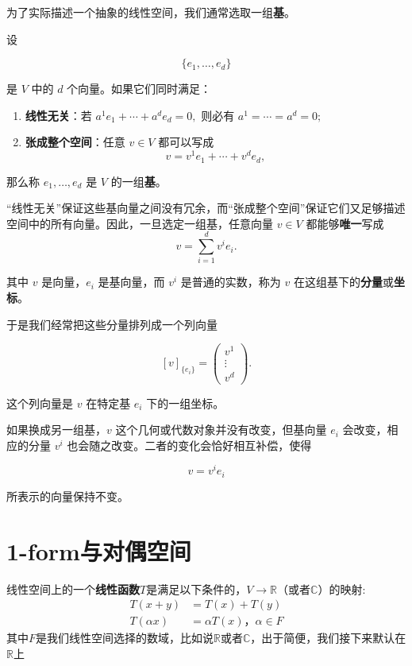 \documentclass[UTF8,11pt,a4paper,fontset=fandol]{ctexart}
\numberwithin{equation}{section}
\begin{document}
为了实际描述一个抽象的线性空间，我们通常选取一组\textbf{基}。

设

$$
\{e_1,\ldots,e_d\}
$$

是 $V$ 中的 $d$ 个向量。如果它们同时满足：

\begin{enumerate}
\item \textbf{线性无关}：若
\(    a^1e_1+\cdots+a^de_d=0,
   \)
则必有
\(    a^1=\cdots=a^d=0;
   \)

\item \textbf{张成整个空间}：任意 $v\in V$ 都可以写成
\[
v=v^1e_1+\cdots+v^de_d,
\]

\end{enumerate}
那么称 ${e_1,\ldots,e_d}$ 是 $V$ 的一组\textbf{基}。

“线性无关”保证这些基向量之间没有冗余，而“张成整个空间”保证它们又足够描述空间中的所有向量。因此，一旦选定一组基，任意向量 $v\in V$ 都能够\textbf{唯一}写成
\begin{equation}
v=\sum_{i=1}^{d}v^i e_i.
\label{eq:vexp}
\end{equation}

其中 $v$ 是向量，$e_i$ 是基向量，而 $v^i$ 是普通的实数，称为 $v$ 在这组基下的\textbf{分量}或\textbf{坐标}。

于是我们经常把这些分量排列成一个列向量

$$
[v]_{\{e_i\}}
=
\begin{pmatrix}
v^1\\
\vdots\\
v^d
\end{pmatrix}.
$$

这个列向量是 $v$ 在特定基 ${e_i}$ 下的一组坐标。

如果换成另一组基，$v$ 这个几何或代数对象并没有改变，但基向量 $e_i$ 会改变，相应的分量 $v^i$ 也会随之改变。二者的变化会恰好相互补偿，使得

$$
v=v^i e_i
$$

所表示的向量保持不变。

\section{1-form与对偶空间}
线性空间上的一个\textbf{线性函数}$T$是满足以下条件的，$V \rightarrow \mathbb{R}$（或者$\mathbb{C}$）的映射:
\begin{align}
    T(x+y) &= T(x)+T(y) \\
    T(\alpha x)&= \alpha T(x)，\alpha\in F
\end{align}
其中$F$是我们线性空间选择的数域，比如说$\mathbb{R}$或者$\mathbb{C}$，出于简便，我们接下来默认在$\mathbb{R}$上
\end{document}
